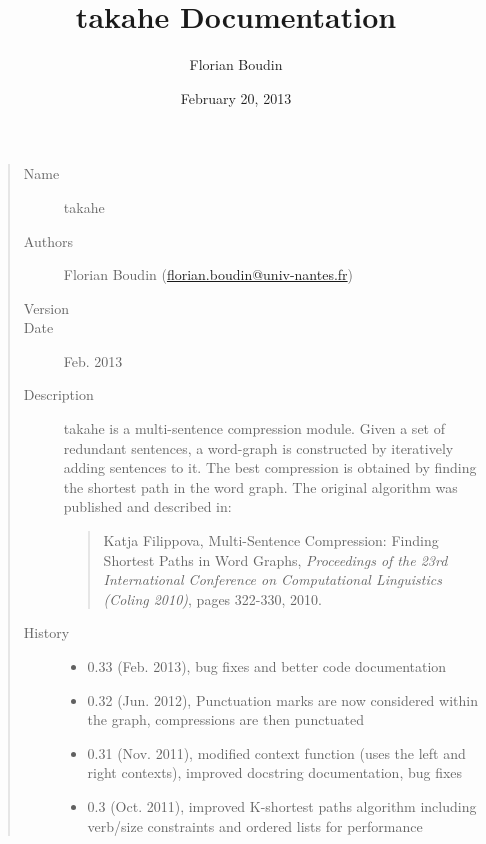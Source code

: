 \documentclass[letterpaper,10pt,english]{sphinxmanual}
\title{takahe Documentation}
\date{February 20, 2013}
\author{Florian Boudin}
\begin{document}
\maketitle
\tableofcontents
{}\label{index::doc}

\label{index:module-takahe}\begin{quote}\begin{description}
\item[{Name}] \leavevmode
takahe

\item[{Authors}] \leavevmode
Florian Boudin (\href{mailto:florian.boudin@univ-nantes.fr}{florian.boudin@univ-nantes.fr})

\item[{Version}] 

\item[{Date}] \leavevmode
Feb. 2013

\item[{Description}] \leavevmode
takahe is a multi-sentence compression module. Given a set of redundant 
sentences, a word-graph is constructed by iteratively adding sentences to 
it. The best compression is obtained by finding the shortest path in the
word graph. The original algorithm was published and described in:
\begin{quote}

Katja Filippova, Multi-Sentence Compression: Finding Shortest Paths
in Word Graphs, \emph{Proceedings of the 23rd International Conference on 
Computational Linguistics (Coling 2010)}, pages 322-330, 2010.
\end{quote}

\item[{History}] \leavevmode\begin{itemize}
\item {} 
0.33 (Feb. 2013), bug fixes and better code documentation

\item {} 
0.32 (Jun. 2012), Punctuation marks are now considered within the graph, 
compressions are then punctuated

\item {} 
0.31 (Nov. 2011), modified context function (uses the left and right 
contexts), improved docstring documentation, bug fixes

\item {} 
0.3 (Oct. 2011), improved K-shortest paths algorithm including verb/size 
constraints and ordered lists for performance


\end{itemize}
\end{description}
\end{quote}
\end{document}
